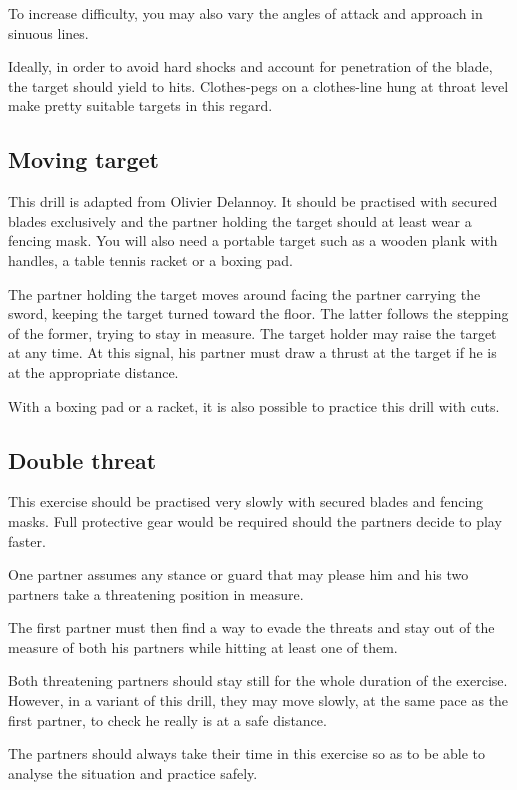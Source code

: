 To increase difficulty, you may also vary the angles of attack and approach in sinuous lines.

Ideally, in order to avoid hard shocks and account for penetration of the blade, the target should yield to hits.
Clothes-pegs on a clothes-line hung at throat level make pretty suitable targets in this regard.

\subsection{Moving target}
This drill is adapted from Olivier Delannoy.
It should be practised with secured blades exclusively and the partner holding the target should at least wear a fencing mask.
You will also need a portable target such as a wooden plank with handles, a table tennis racket or a boxing pad.

The partner holding the target moves around facing the partner carrying the sword, keeping the target turned toward the floor.
The latter follows the stepping of the former, trying to stay in measure.
The target holder may raise the target at any time.
At this signal, his partner must draw a thrust at the target if he is at the appropriate distance.

With a boxing pad or a racket, it is also possible to practice this drill with cuts.

\subsection{Double threat}
This exercise should be practised very slowly with secured blades and fencing masks.
Full protective gear would be required should the partners decide to play faster.

One partner assumes any stance or guard that may please him and his two partners take a threatening position in measure.

The first partner must then find a way to evade the threats and stay out of the measure of both his partners while hitting at least one of them.

Both threatening partners should stay still for the whole duration of the exercise.
However, in a variant of this drill, they may move slowly, at the same pace as the first partner, to check he really is at a safe distance.

The partners should always take their time in this exercise so as to be able to analyse the situation and practice safely. 

